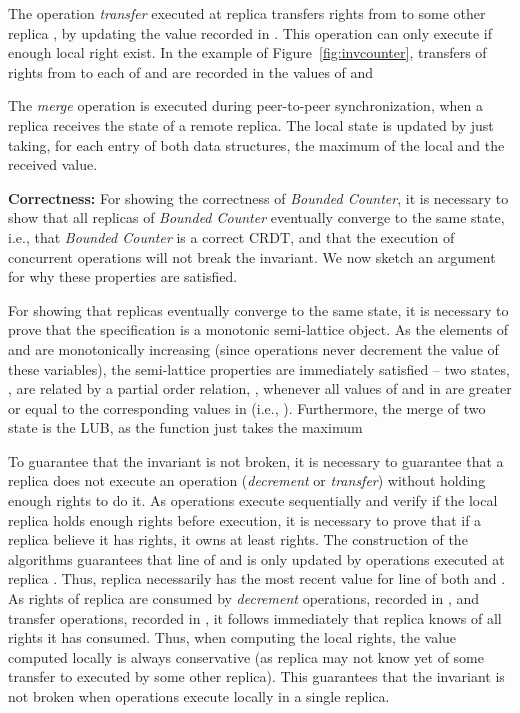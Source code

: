 \documentclass[conference]{IEEEtran}
\newcommand{\InvCounter}{\emph{Bounded Counter}}
\begin{document}
The operation \emph{transfer} executed at replica   
transfers rights from  to some other replica , by updating the
value recorded in .
This operation can only execute if enough local right exist.
In the example of Figure~\ref{fig:invcounter}, transfers of  rights from 
 to each of  and  are recorded in the values of  and 

The \emph{merge} operation is executed during peer-to-peer synchronization,
when a replica receives the state of a remote replica. 
The local state is updated by just taking, for each entry of both data structures, 
the maximum of the local and the received value.

{\bf Correctness:}
For showing the correctness of \InvCounter{}, it is necessary to show 
that all replicas of \InvCounter{} eventually converge to the same state, i.e., that
\InvCounter{} is a correct CRDT, and 
that the execution of concurrent operations will not break the invariant. 
We now sketch an argument for why these properties are satisfied.

For showing that replicas eventually converge to the same state, 
it is necessary to prove that the specification is a monotonic semi-lattice object. 
As the elements of  and  are monotonically increasing (since operations never 
decrement the value of these variables), the semi-lattice properties are 
immediately satisfied -- two states, , are related by a partial order 
relation, , whenever all values of  and  in  are greater 
or equal to the corresponding values in  
(i.e., ).
Furthermore, the merge of two state is the LUB, as the function just takes the maximum 

To guarantee that the invariant is not broken, it is necessary to guarantee 
that a replica does not execute an operation (\emph{decrement} or \emph{transfer}) 
without holding enough rights to do it. 
As operations execute sequentially and verify if the local replica holds enough 
rights before execution, 
it is necessary to prove that if a replica believe it has  rights, 
it owns at least  rights. 
The construction of the algorithms guarantees that line  of  and  is only updated by operations 
executed at replica . Thus, replica  necessarily has the most recent value 
for line  of both  and . 
As rights of replica  are consumed by \emph{decrement} operations, recorded in , 
and transfer operations, recorded in , it follows immediately that replica 
 knows of all rights it has consumed. 
Thus, when computing the local rights, the value computed locally is always conservative 
(as replica  may not know yet of some transfer to  executed by some other replica).
This guarantees that the invariant is not broken when operations 
execute locally in a single replica.
\end{document}
